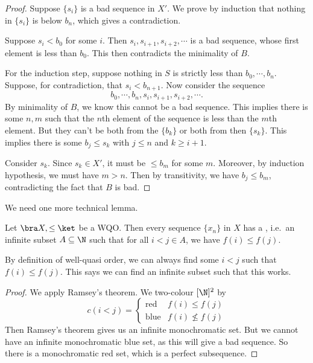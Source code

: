 \documentclass[a4paper]{article}
\begin{document}
\begin{proof}
  Suppose $\{s_i\}$ is a bad sequence in $X'$. We prove by induction that nothing in $\{s_i\}$ is below $b_n$, which gives a contradiction.

  Suppose $s_i < b_0$ for some $i$. Then $s_i, s_{i + 1}, s_{i + 2}, \cdots$ is a bad sequence, whose first element is less than $b_0$. This then contradicts the minimality of $B$.

  For the induction step, suppose nothing in $S$ is strictly less than $b_0, \cdots, b_n$. Suppose, for contradiction, that $s_i < b_{n + 1}$. Now consider the sequence
  \[
    b_0, \cdots, b_n, s_i, s_{i + 1}, s_{i + 2}, \cdots.
  \]
  By minimality of $B$, we know this cannot be a bad sequence. This implies there is some $n, m$ such that the $n$th element of the sequence is less than the $m$th element. But they can't be both from the $\{b_k\}$ or both from then $\{s_k\}$. This implies there is some $b_j \leq s_k$ with $j \leq n$ and $k \geq i + 1$.

  Consider $s_k$. Since $s_k \in X'$, it must be $\leq b_m$ for some $m$. Moreover, by induction hypothesis, we must have $m > n$. Then by transitivity, we have $b_j \leq b_m$, contradicting the fact that $B$ is bad.
\end{proof}

We need one more technical lemma.

\begin{lemma}
  Let $\bra X, \leq\ket$ be a WQO. Then every sequence $\{x_n\}$ in $X$ has a , i.e.\ an infinite subset $A \subseteq \N$ such that for all $i < j \in A$, we have $f(i) \leq f(j)$.
\end{lemma}
By definition of well-quasi order, we can always find some $i < j$ such that $f(i) \leq f(j)$. This says we can find an infinite subset such that this works.

\begin{proof}
  We apply Ramsey's theorem. We two-colour $[\N]^2$ by
  \[
    c(i < j) =
    \begin{cases}
      \mathrm{red} & f(i) \leq f(j)\\
      \mathrm{blue} & f(i) \not\leq f(j)
    \end{cases}
  \]
  Then Ramsey's theorem gives us an infinite monochromatic set. But we cannot have an infinite monochromatic blue set, as this will give a bad sequence. So there is a monochromatic red set, which is a perfect subsequence.
\end{proof}
\end{document}
